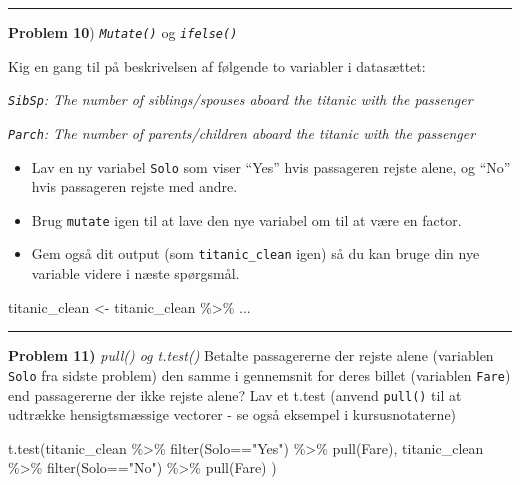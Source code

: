 \documentclass[
]{book}
\newenvironment{Shaded}{\begin{snugshade}}{\end{snugshade}}
\newcommand{\FunctionTok}[1]{\textcolor[rgb]{0.00,0.00,0.00}{#1}}
\newcommand{\NormalTok}[1]{#1}
\newcommand{\OtherTok}[1]{\textcolor[rgb]{0.56,0.35,0.01}{#1}}
\newcommand{\SpecialCharTok}[1]{\textcolor[rgb]{0.00,0.00,0.00}{#1}}
\newcommand{\StringTok}[1]{\textcolor[rgb]{0.31,0.60,0.02}{#1}}
\providecommand{\tightlist}{%
  \setlength{\itemsep}{0pt}\setlength{\parskip}{0pt}}
\begin{document}
\begin{center}\rule{0.5\linewidth}{0.5pt}\end{center}

\textbf{Problem 10}) \emph{\texttt{Mutate()}} og \emph{\texttt{ifelse()}}

Kig en gang til på beskrivelsen af følgende to variabler i datasættet:

\emph{\texttt{SibSp}: The number of siblings/spouses aboard the titanic with the passenger}

\emph{\texttt{Parch}: The number of parents/children aboard the titanic with the passenger}

\begin{itemize}
\tightlist
\item
  Lav en ny variabel \texttt{Solo} som viser ``Yes'' hvis passageren rejste alene, og ``No'' hvis passageren rejste med andre.
\item
  Brug \texttt{mutate} igen til at lave den nye variabel om til at være en factor.
\item
  Gem også dit output (som \texttt{titanic\_clean} igen) så du kan bruge din nye variable videre i næste spørgsmål.
\end{itemize}

\begin{Shaded}
\begin{Highlighting}[]
\NormalTok{titanic\_clean }\OtherTok{\textless{}{-}}\NormalTok{ titanic\_clean }\SpecialCharTok{\%\textgreater{}\%}\NormalTok{  ... }
\end{Highlighting}
\end{Shaded}

\begin{center}\rule{0.5\linewidth}{0.5pt}\end{center}

\textbf{Problem 11)} \emph{pull() og t.test()} Betalte passagererne der rejste alene (variablen \texttt{Solo} fra sidste problem) den samme i gennemsnit for deres billet (variablen \texttt{Fare}) end passagererne der ikke rejste alene? Lav et t.test (anvend \texttt{pull()} til at udtrække hensigtsmæssige vectorer - se også eksempel i kursusnotaterne)

\begin{Shaded}
\begin{Highlighting}[]
\FunctionTok{t.test}\NormalTok{(titanic\_clean }\SpecialCharTok{\%\textgreater{}\%} \FunctionTok{filter}\NormalTok{(Solo}\SpecialCharTok{==}\StringTok{"Yes"}\NormalTok{) }\SpecialCharTok{\%\textgreater{}\%} \FunctionTok{pull}\NormalTok{(Fare),}
\NormalTok{       titanic\_clean }\SpecialCharTok{\%\textgreater{}\%} \FunctionTok{filter}\NormalTok{(Solo}\SpecialCharTok{==}\StringTok{"No"}\NormalTok{) }\SpecialCharTok{\%\textgreater{}\%} \FunctionTok{pull}\NormalTok{(Fare) )}
\end{Highlighting}
\end{Shaded}
\end{document}
